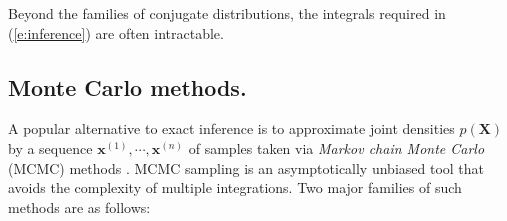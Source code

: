 \documentclass[]{article}
\newcommand{\bvec}[1]{\textbf{#1}}
\newcommand{\pr}{p}
\newcommand{\dd}{\;\mathrm{d}} %
\begin{document}
Beyond the families of conjugate distributions, the integrals required in 
(\ref{e:inference}) 
are often intractable. 


\subsection{Monte Carlo methods.}
A popular alternative to exact inference is to approximate joint densities $\pr(\bvec{X})$ 
by a sequence $\bvec{x}^{(1)}, \cdots, \bvec{x}^{(n)}$ of samples taken
 via \emph{Markov chain Monte Carlo} (MCMC) methods \citep{koller2009probabilistic}.  
MCMC sampling is an asymptotically unbiased tool that avoids the complexity of multiple integrations. %
Two major families of such methods are as follows:

\end{document}
